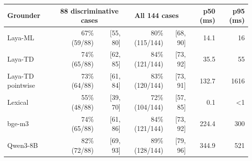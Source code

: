 \begin{tabular}{lrrrrrr}
\toprule
Grounder & \multicolumn{2}{c}{88 discriminative cases} & \multicolumn{2}{c}{All 144 cases} & p50 (ms) & p95 (ms) \\
\midrule
Laya-ML & 67\% (59/88) & [55, 80] & 80\% (115/144) & [68, 90] & 14.1 & 16 \\
Laya-TD & 74\% (65/88) & [62, 85] & 84\% (121/144) & [73, 92] & 35.5 & 55 \\
Laya-TD pointwise & 73\% (64/88) & [61, 84] & 83\% (120/144) & [73, 91] & 132.7 & 1616 \\
Lexical & 55\% (48/88) & [39, 70] & 72\% (104/144) & [57, 85] & 0.1 & <1 \\
bge-m3 & 74\% (65/88) & [61, 86] & 84\% (121/144) & [73, 92] & 224.4 & 300 \\
Qwen3-8B & 82\% (72/88) & [69, 93] & 89\% (128/144) & [79, 96] & 344.9 & 521 \\
\bottomrule
\end{tabular}
